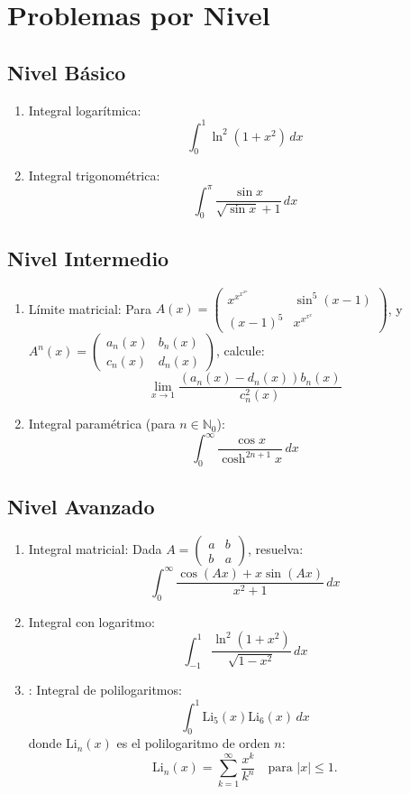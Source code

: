 \documentclass[10pt,a4paper]{article}
\newcommand{\polylog}[2]{\text{Li}_{#1}(#2)} %
\begin{document}
	
	\section*{Problemas por Nivel}
	
	\subsection*{Nivel Básico}
	
	\begin{enumerate}
		\item Integral logarítmica:
		\[
		\int_0^1 \ln^2(1+x^2) \, dx
		\]
		
		\item Integral trigonométrica:
		\[
		\int_0^{\pi} \frac{\sin x}{\sqrt{\sin x} + 1} \, dx
		\]
	\end{enumerate}
	
	\subsection*{Nivel Intermedio}
	
	\begin{enumerate}
		\item Límite matricial: Para 
		\( A(x) = \begin{pmatrix}
			x^{x^{x^{x^x}}} & \sin^5(x-1) \\
			(x-1)^5 & x^{x^{x^x}}
		\end{pmatrix} \), y \( A^n(x) = \begin{pmatrix}
			a_n(x) & b_n(x) \\
			c_n(x) & d_n(x)
		\end{pmatrix} \), calcule:
		\[
		\lim_{x \to 1} \frac{(a_n(x) - d_n(x))b_n(x)}{c_n^2(x)}
		\]
		
		\item Integral paramétrica (para \( n \in \mathbb{N}_0 \)):
		\[
		\int_0^\infty \frac{\cos x}{\cosh^{2n+1} x} \, dx
		\]
	\end{enumerate}
	
	\subsection*{Nivel Avanzado}
	
	\begin{enumerate}
		\item Integral matricial: Dada \( A = \begin{pmatrix}
			a & b \\
			b & a
		\end{pmatrix} \), resuelva:
		\[
		\int_0^\infty \frac{\cos(Ax) + x \sin(Ax)}{x^2 + 1} \, dx
		\]
		
		\item Integral con logaritmo:
		\[
		\int_{-1}^1 \frac{\ln^2(1+x^2)}{\sqrt{1-x^2}} \, dx
		\]
		
		\item  : Integral de polilogaritmos:
		\[
		\int_0^1 \polylog{5}{x} \polylog{6}{x} \, dx
		\]
		donde \( \polylog{n}{x} \) es el polilogaritmo de orden \( n \):
		\[
		\polylog{n}{x} = \sum_{k=1}^\infty \frac{x^k}{k^n} \quad \text{para } |x| \leq 1.
		\]
	\end{enumerate}
	
\end{document}

